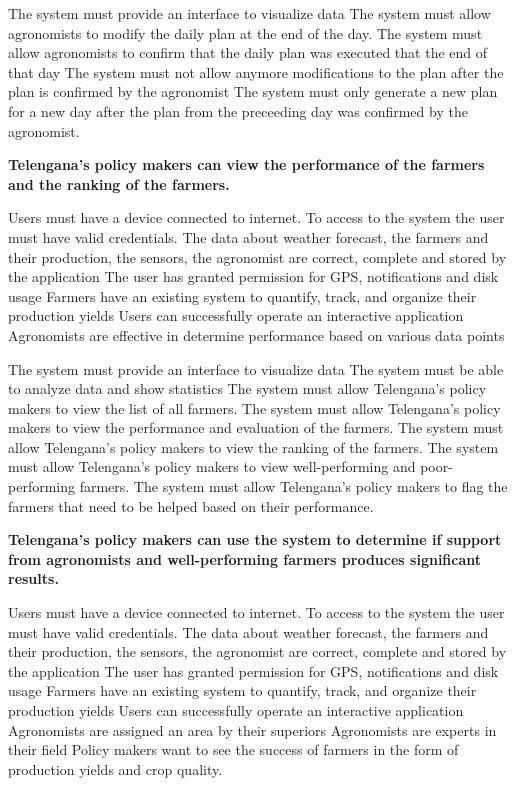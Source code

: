 \begin{itemize}
\begin{itemize}
 The system must provide an interface to visualize data
 The system must allow agronomists to modify the daily plan at the end of the day.
 The system must allow agronomists to confirm that the daily plan was executed that the end of that day
 The system must not allow anymore modifications to the plan after the plan is confirmed by the agronomist
 The system must only generate a new plan for a new day after the plan from the preceeding day was confirmed by the agronomist.
\end{itemize}

 \textbf{Telengana’s policy makers can view the performance of the farmers and the ranking of the farmers. }
\begin{itemize}
  Users must have a device connected to internet.
 To access to the system the user must have valid credentials.
 The data about weather forecast, the farmers and their production, the sensors, the agronomist are correct, complete and stored by the application
 The user has granted permission for GPS, notifications and disk usage
 Farmers have an existing system to quantify, track, and organize their production yields
 Users can successfully operate an interactive application
 Agronomists are effective in determine performance based on various data points


 The system must provide an interface to visualize data
 The system must be able to analyze data and show statistics
 The system must allow Telengana’s policy makers to view the list of all farmers.
 The system must allow Telengana’s policy makers to view the performance and evaluation of the farmers.
 The system must allow Telengana’s policy makers to view the ranking of the farmers.
 The system must allow Telengana’s policy makers to view well-performing and poor-performing farmers.
 The system must allow Telengana’s policy makers to flag the farmers that need to be helped based on their performance.
\end{itemize}

 \textbf{Telengana’s policy makers can use the system to determine if support from agronomists and well-performing farmers produces significant results.}

\begin{itemize}
  Users must have a device connected to internet.
 To access to the system the user must have valid credentials.
 The data about weather forecast, the farmers and their production, the sensors, the agronomist are correct, complete and stored by the application
 The user has granted permission for GPS, notifications and disk usage
 Farmers have an existing system to quantify, track, and organize their production yields
 Users can successfully operate an interactive application
 Agronomists are assigned an area by their superiors
 Agronomists are experts in their field
 Policy makers want to see the success of farmers in the form of production yields and crop quality.


\end{itemize}
\end{itemize}
